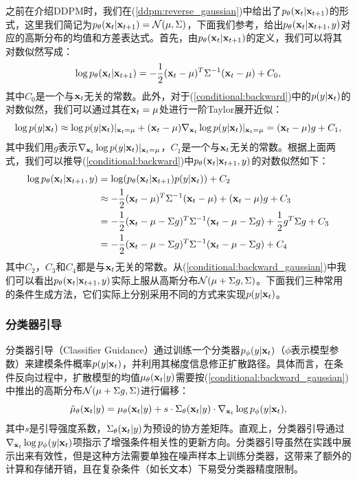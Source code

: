 \documentclass[11pt,a4paper,UTF8]{ctexart}
\begin{document}
之前在介绍DDPM时，我们在(\ref{ddpm:reverse_gaussian})中给出了$p_\theta(\mathbf{x}_{t}|\mathbf{x}_{t+1})$的形式，这里我们简记为$p_\theta(\mathbf{x}_{t}|\mathbf{x}_{t+1})=\mathcal{N}(\mu,\Sigma)$，下面我们参考\cite{dhariwal2021diffusion}，给出$p_{\theta}(\mathbf{x}_{t}|\mathbf{x}_{t+1},y)$对应的高斯分布的均值和方差表达式。首先，由$p_{\theta}(\mathbf{x}_{t}|\mathbf{x}_{t+1})$的定义，我们可以将其对数似然写成：
\begin{equation*}
    \log p_{\theta}(\mathbf{x}_{t}|\mathbf{x}_{t+1}) = -\frac{1}{2}(\mathbf{x}_t-\mu)^{T}\Sigma^{-1}(\mathbf{x}_t-\mu) + C_0,
\end{equation*}
其中$C_0$是一个与$\mathbf{x}_t$无关的常数。此外，对于(\ref{conditional:backward})中的$p(y|\mathbf{x}_t)$的对数似然，我们可以通过其在$\mathbf{x}_t=\mu$处进行一阶Taylor展开近似：
\begin{equation*}
    \log p(y|\mathbf{x}_t)\approx \log p(y|\mathbf{x}_t)|_{\mathbf{x}_t=\mu} + (\mathbf{x}_t-\mu)\nabla_{\mathbf{x}_t} \log p(y|\mathbf{x}_t)|_{\mathbf{x}_t=\mu} = (\mathbf{x}_t-\mu)g + C_1,
\end{equation*}
其中我们用$g$表示$\nabla_{\mathbf{x}_t} \log p(y|\mathbf{x}_t)|_{\mathbf{x}_t=\mu}$，$C_1$是一个与$\mathbf{x}_t$无关的常数。根据上面两式，我们可以推导(\ref{conditional:backward})中$p_{\theta}(\mathbf{x}_{t}|\mathbf{x}_{t+1},y)$的对数似然如下：
\begin{align}
\begin{split}
    \log p_{\theta}(\mathbf{x}_{t}|\mathbf{x}_{t+1},y) &= \log(p_\theta(\mathbf{x}_{t}|\mathbf{x}_{t+1})p(y|\mathbf{x}_t)) + C_2 \\
    &\approx -\frac{1}{2}(\mathbf{x}_t-\mu)^{T}\Sigma^{-1}(\mathbf{x}_t-\mu) + (\mathbf{x}_t-\mu)g + C_3 \\
    &= -\frac{1}{2} (\mathbf{x}_t-\mu-\Sigma g)^{T}\Sigma^{-1}(\mathbf{x}_t-\mu-\Sigma g) + \frac{1}{2}g^T\Sigma g + C_3 \\
    &= -\frac{1}{2} (\mathbf{x}_t-\mu-\Sigma g)^{T}\Sigma^{-1}(\mathbf{x}_t-\mu-\Sigma g) + C_4
\end{split}
\label{conditional:backward_gaussian}
\end{align}
其中$C_2$，$C_3$和$C_4$都是与$\mathbf{x}_t$无关的常数。从(\ref{conditional:backward_gaussian})中我们可以看出$p_{\theta}(\mathbf{x}_{t}|\mathbf{x}_{t+1},y)$实际上服从高斯分布$\mathcal{N}(\mu+\Sigma g,\Sigma)$。下面我们三种常用的条件生成方法，它们实际上分别采用不同的方式来实现$p(y|\mathbf{x}_t)$。

\subsubsection{分类器引导}

分类器引导（Classifier Guidance）\cite{dhariwal2021diffusion}通过训练一个分类器$p_{\phi}(y|\mathbf{x}_t)$（$\phi$表示模型参数）来建模条件概率$p(y|\mathbf{x}_t)$，并利用其梯度信息修正扩散路径。具体而言，在条件反向过程中，扩散模型的均值$\mu_\theta(\mathbf{x}_t|y)$需要按(\ref{conditional:backward_gaussian})中推出的高斯分布$\mathcal{N}(\mu+\Sigma g,\Sigma)$进行偏移：
\begin{equation}
\hat{\mu}_{\theta}(\mathbf{x}_t|y)=\mu_{\theta}(\mathbf{x}_t|y) + s\cdot\Sigma_\theta(\mathbf{x}_t|y)\cdot\nabla_{\mathbf{x}_t}\log p_{\phi}(y|\mathbf{x}_t),
\label{conditional_classifier_guided}
\end{equation}
其中$s$是引导强度系数，$\Sigma_\theta(\mathbf{x}_t|y)$为预设的协方差矩阵。直观上，分类器引导通过$\nabla_{\mathbf{x}_t}\log p_{\phi}(y|\mathbf{x}_t)$项指示了增强条件相关性的更新方向。分类器引导虽然在实践中展示出来有效性，但是这种方法需要单独在噪声样本上训练分类器，这带来了额外的计算和存储开销，且在复杂条件（如长文本）下易受分类器精度限制。
\end{document}
